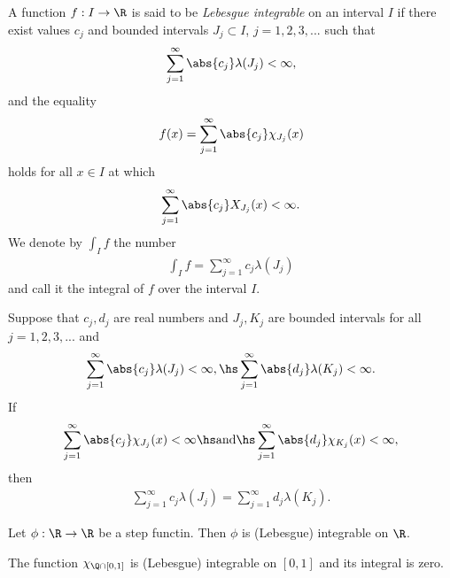 \documentclass{article}
\begin{document}
\begin{definition}[Notes 4.3]
    A function $f:I\to\R$ is said to be \emph{Lebesgue integrable} on an interval 
    $I$ if there exist values $c_j$ and bounded intervals $J_j\subset I$, $j=1,2,3,...$
    such that 
    \begin{align*}
        \sum_{j=1}^\infty \abs{c_j}\lambda (J_j) < \infty,
    \end{align*}
    and the equality 
    \begin{align*}
        f(x) = \sum_{j=1}^\infty \abs{c_j}\chi_{J_j}(x)
    \end{align*}
    holds for all $x\in I$ at which
    \begin{align*}
        \sum_{j=1}^\infty \abs{c_j} X_{J_j}(x) < \infty.
    \end{align*}
    We denote by $\int_I f$ the number 
    \begin{align*}
        \int_I f = \sum_{j=1}^\infty c_j\lambda(J_j)
    \end{align*}
    and call it the integral of $f$ over the interval $I$.
\end{definition}

\begin{theorem}[Notes 4.1]
    Suppose that $c_j,d_j$ are real numbers and $J_j,K_j$ are bounded intervals 
    for all $j=1,2,3,...$ and 
    \begin{align*}
        \sum_{j=1}^\infty \abs{c_j}\lambda(J_j)<\infty, \hs
        \sum_{j=1}^\infty \abs{d_j}\lambda(K_j)<\infty.
    \end{align*} 
    If 
    \begin{align*}
        \sum_{j=1}^\infty \abs{c_j}\chi_{J_j}(x) < \infty\hs\text{and}\hs 
        \sum_{j=1}^\infty \abs{d_j}\chi_{K_j}(x) <\infty,
    \end{align*}
    then
    \begin{align*}
        \sum_{j=1}^\infty c_j\lambda(J_j)= \sum_{j=1}^\infty d_j\lambda(K_j).
    \end{align*}
\end{theorem}

\begin{corollary}
    Let $\phi:\R\to\R$ be a step functin. Then $\phi$ is (Lebesgue) integrable on $\R$.
\end{corollary}

\begin{corollary}
    The function $\chi_{\Q\cap[0,1]}$ is (Lebesgue) integrable on $[0,1]$ and its integral is zero.
\end{corollary}
\end{document}
